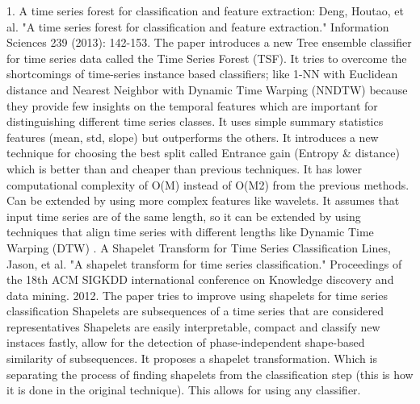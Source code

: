 1. A time series forest for classification and feature extraction:
\newline Deng, Houtao, et al. "A time series forest for classification and feature extraction." Information Sciences 239 (2013): 142-153.
\newline The paper introduces a new Tree ensemble classifier for time series data called the Time Series Forest (TSF).
\newline It tries to overcome the shortcomings of time-series instance based classifiers; like 1-NN with Euclidean distance and Nearest Neighbor with Dynamic Time Warping (NNDTW) because they provide few insights on the temporal features which are important for distinguishing different time series classes.
\newline It uses simple summary statistics features (mean, std, slope) but outperforms the others.
\newline It introduces a new technique for choosing the best split called Entrance gain (Entropy \& distance) which is better than and cheaper than previous techniques.
\newline It has lower computational complexity of O(M) instead of O(M2) from the previous methods.
\newline Can be extended by using more complex features like wavelets.
\newline It assumes that input time series are of the same length, so it can be extended by using techniques that align time series with different lengths like Dynamic Time Warping (DTW)
. A Shapelet Transform for Time Series Classification
\newline Lines, Jason, et al. "A shapelet transform for time series classification." Proceedings of the 18th ACM SIGKDD international conference on Knowledge discovery and data mining. 2012.
\newline The paper tries to improve using shapelets for time series classification
\newline Shapelets are subsequences of a time series that are considered representatives
\newline Shapelets are easily interpretable, compact and classify new instaces fastly, allow for the detection of phase-independent shape-based similarity of subsequences.
\newline It proposes a shapelet transformation. Which is separating the process of finding shapelets from the classification step (this is how it is done in the original technique). This allows for using any classifier.
